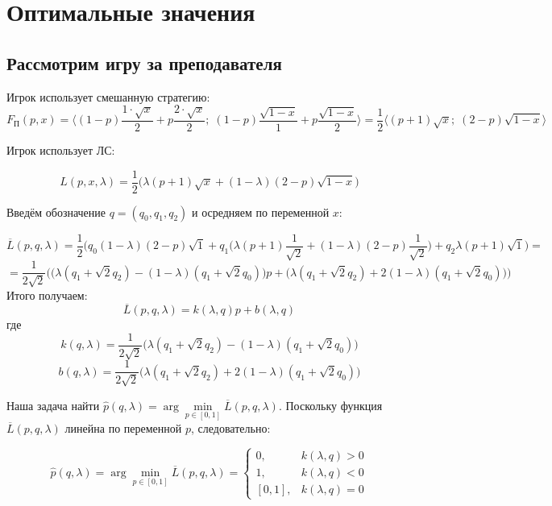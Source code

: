 \section{Оптимальные значения}

\subsection{Рассмотрим игру за преподавателя}
\begin{flushleft}
	Игрок использует смешанную стратегию:\\
	
	$$
	F_\textrm{П}(p,x)=
	\big \langle 
		(1-p)\frac{1 \cdot \sqrt{x}}{2} + p \frac{2 \cdot \sqrt{x}}{2}; \;
		(1-p)\frac{\sqrt{1-x}}{1}+p\frac{\sqrt{1-x}}{2} 
	\big \rangle=
	\frac{1}{2}
	\big \langle
		(p+1)\sqrt{x}; \;
		(2-p)\sqrt{1-x}
	\big \rangle
	$$
	
	Игрок использует ЛС:
	
	$$
	L(p,x,\lambda)=
	\frac{1}{2}
	\big(
		\lambda(p+1)\sqrt{x} + (1-\lambda)(2-p)\sqrt{1-x}
	\big)
	$$
	
	Введём обозначение $q=(q_0,q_1,q_2)$ и осредняем по переменной $x$:
	
	$$ 
	\overline{L}(p,q,\lambda)=
	\frac{1}{2} 
	\Big(
		q_0(1-\lambda)(2-p)\sqrt{1}+
		q_1 \big (\lambda(p+1)\frac{1}{\sqrt{2}} + 
		(1-\lambda)(2-p)\frac{1}{\sqrt{2}} \big )+
		q_2\lambda(p+1)\sqrt{1}
	\Big)=
	$$
	$$
	=\frac{1}{2\sqrt{2}}
	\Big (
		\big (\lambda(q_1+\sqrt{2}q_2)-(1-\lambda)(q_1+\sqrt{2}q_0) \big)p+
		\big (\lambda(q_1+\sqrt{2}q_2)+2(1-\lambda)(q_1+\sqrt{2}q_0) \big)
	\Big)
	$$
	Итого получаем:
	$$
	\overline{L}(p,q,\lambda)=k(\lambda,q)p+b(\lambda,q)
	$$
	где
	$$
	k(q, \lambda) = \frac{1}{2\sqrt{2}}
		\big (\lambda(q_1+\sqrt{2}q_2)-(1-\lambda)(q_1+\sqrt{2}q_0) \big)
	$$
	$$
	b(q, \lambda) = \frac{1}{2\sqrt{2}}
		\big (\lambda(q_1+\sqrt{2}q_2)+2(1-\lambda)(q_1+\sqrt{2}q_0) \big)
	$$
	
	Наша задача найти 
	$\hat p(q, \lambda)=\arg \min \limits_{p \in [0, 1]} \overline{L}(p,q,\lambda)$.
	Поскольку функция $\overline{L}(p,q,\lambda)$ линейна по переменной 
	$p$, следовательно:
	
	$$
		\hat p(q, \lambda)=
		\arg \min \limits_{p \in [0, 1]} \overline{L}(p,q,\lambda)=
		\begin{cases}
			0, & k(\lambda,q)>0 \\
			1, & k(\lambda,q)<0 \\
			[0,1], & k(\lambda,q)=0
		\end{cases}	
	$$
	

\end{flushleft}
